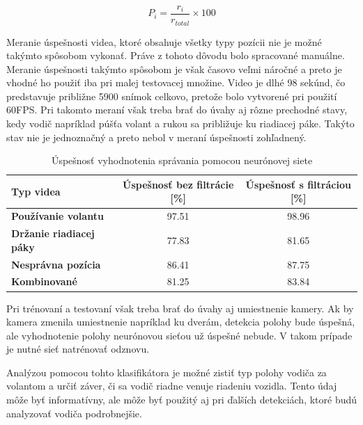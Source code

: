\documentclass[slovak,master,dept460,male,cpp,cpdeclaration]{diploma}
\begin{document}
\begin{equation}
P_i= \frac{r_i}{r_{total}} \times 100
\label{eq:prediction}
\end{equation}

Meranie úspešnosti videa, ktoré obsahuje všetky typy pozícii nie je možné takýmto spôsobom vykonať. Práve z tohoto dôvodu bolo spracované manuálne. Meranie úspešnosti takýmto spôsobom je však časovo veľmi náročné a preto je vhodné ho použiť iba pri malej testovacej množine. Video je dlhé 98 sekúnd, čo predstavuje približne 5900 snímok celkovo, pretože bolo vytvorené pri použití 60FPS. Pri takomto meraní však treba brať do úvahy aj rôzne prechodné stavy, kedy vodič napríklad púšťa volant a rukou sa približuje ku riadiacej páke. Takýto stav nie je jednoznačný a preto nebol v meraní úspešnosti zohľadnený.

\begin{table}[H]
\begin{tabular}{|l|c|c|}
\hline
\textbf{Typ videa}        & \textbf{Úspešnosť bez filtrácie [\%]}  & \textbf{Úspešnosť s filtráciou [\%]} \\ \hline
\textbf{Používanie volantu}      & 97.51     &  98.96       \\ \hline
\textbf{Držanie riadiacej páky}      & 77.83     &  81.65    \\ \hline
\textbf{Nesprávna pozícia}      & 86.41     &  87.75   \\ \hline
\textbf{Kombinované}      & 81.25     &  83.84   \\ \hline
\end{tabular}

	\caption{Úspešnosť vyhodnotenia správania pomocou neurónovej siete}
	\label{tab:tf3}
\end{table}

Pri trénovaní a testovaní však treba brať do úvahy aj umiestnenie kamery. Ak by kamera zmenila umiestnenie napríklad ku dverám, detekcia polohy bude úspešná, ale  vyhodnotenie polohy neurónovou sieťou už úspešné nebude. V takom prípade je nutné sieť natrénovať odznovu.\par 
Analýzou pomocou tohto klasifikátora je možné zistiť typ polohy vodiča za volantom a určiť záver, či sa vodič riadne venuje riadeniu vozidla. Tento údaj môže byť informatívny, ale môže byť použitý aj pri  ďalších detekciách, ktoré budú analyzovať vodiča podrobnejšie.
 
\newpage
\end{document}
